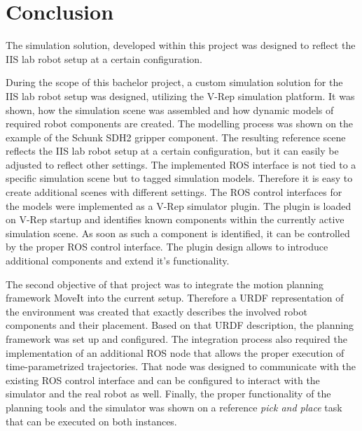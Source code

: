 
\chapter{Conclusion}

The simulation solution, developed within this project was designed to reflect the IIS lab robot setup at a certain configuration.

During the scope of this bachelor project, a custom simulation solution for the IIS lab robot setup was designed, utilizing the V-Rep simulation platform. It was shown, how the simulation scene was assembled and how dynamic models of required robot components are created. The modelling process was shown on the example of the Schunk SDH2 gripper component. The resulting reference scene reflects the IIS lab robot setup at a certain configuration, but it can easily be adjusted to reflect other settings. The implemented ROS interface is not tied to a specific simulation scene but to tagged simulation models. Therefore it is easy to create additional scenes with different settings. The ROS control interfaces for the models were implemented as a V-Rep simulator plugin. The plugin is loaded on V-Rep startup and identifies known components within the currently active simulation scene. As soon as such a component is identified, it can be controlled by the proper ROS control interface. The plugin design allows to introduce additional components and extend it's functionality.

The second objective of that project was to integrate the motion planning framework MoveIt into the current setup. Therefore a URDF representation of the environment was created that exactly describes the involved robot components and their placement. Based on that URDF description, the planning framework was set up and configured. The integration process also required the implementation of an additional ROS node that allows the proper execution of time-parametrized trajectories. That node was designed to communicate with the existing ROS control interface and can be configured to interact with the simulator and the real robot as well. Finally, the proper functionality of the planning tools and the simulator was shown on a reference \emph{pick and place} task that can be executed on both instances.
